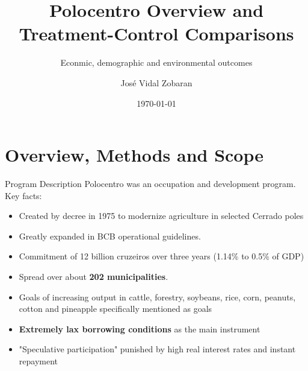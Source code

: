 \documentclass[aspectratio=169]{beamer}
\title[UTW]{Polocentro Overview and Treatment-Control Comparisons}
\subtitle{Econmic, demographic and environmental outcomes}
\author{José Vidal Zobaran}
\institute{FGV-EPGE}
\date{\today}
\begin{document}
\begin{frame}
  \titlepage
\end{frame}

\section{Overview, Methods and Scope}

\begin{frame}{Program Description}
Polocentro was an occupation and development program. Key facts:
\begin{itemize}
    \item Created by decree in 1975 to modernize agriculture in selected Cerrado poles
    \item Greatly expanded in BCB operational guidelines.
    \item Commitment of 12 billion cruzeiros over three years (1.14\% to 0.5\% of GDP)
    \item Spread over about \textbf{202 municipalities}.
    \item Goals of increasing output in cattle, forestry, soybeans, rice, corn, peanuts, cotton and pineapple specifically mentioned as goals
    \item \textbf{Extremely lax borrowing conditions} as the main instrument
    \item "Speculative participation" punished by high real interest rates and instant repayment
\end{itemize}
\end{frame}
\end{document}
